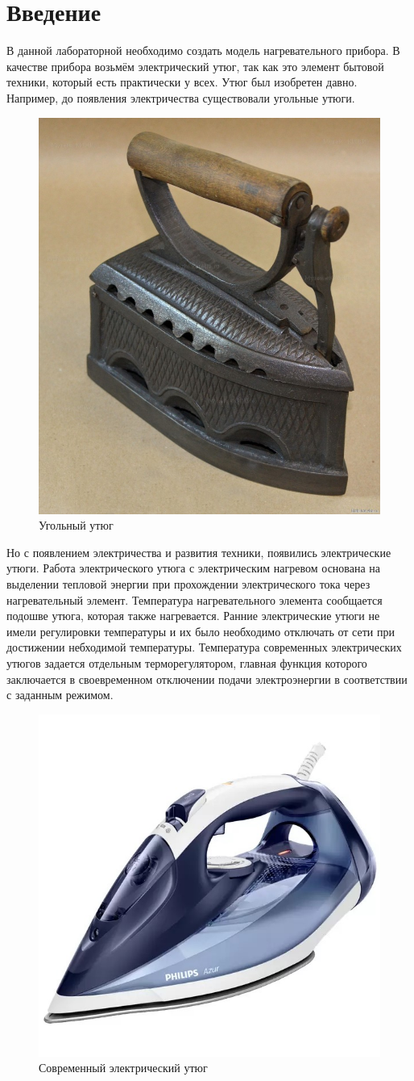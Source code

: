 \documentclass[a4paper, 14pt]{extarticle}
\begin{document}
	\pagebreak	

	\section{Введение}
		В данной лабораторной необходимо создать модель нагревательного прибора. В качестве прибора возьмём электрический утюг, так как это элемент бытовой техники, который есть практически у всех. Утюг был изобретен давно. Например, до появления электричества существовали угольные утюги.	
		
		\begin{figure}[H]
			\centering
			\includegraphics[width = .5\linewidth]{utug0.jpg}
			\caption[.] {Угольный утюг}
		\end{figure}
		
 		Но с появлением электричества и развития техники, появились электрические утюги. Работа электрического утюга с электрическим нагревом основана на выделении тепловой энергии при прохождении электрического тока через нагревательный элемент. Температура нагревательного элемента сообщается подошве утюга, которая также нагревается. Ранние электрические утюги не имели регулировки температуры и их было необходимо отключать от сети при достижении небходимой температуры. Температура современных электрических утюгов задается отдельным терморегулятором, главная функция которого заключается в своевременном отключении подачи электроэнергии в соответствии с заданным режимом.
		
		\begin{figure}[H]
			\centering
			\includegraphics[width = .5\linewidth]{utug.jpg}
			\caption[.] {Современный электрический утюг}
		\end{figure}
	
\end{document}
